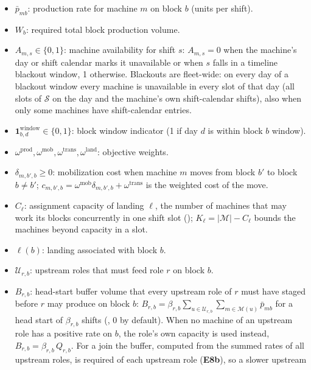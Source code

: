 \begin{itemize}
\tightlist
\item
  \(\bar{p}_{mb}\): production rate for machine \(m\) on block \(b\)
  (units per shift).
\item
  \(W_b\): required total block production volume.
\item
  \(A_{m,s} \in \{0,1\}\): machine availability for shift \(s\):
  \(A_{m,s}=0\) when the machine's day or shift calendar marks it
  unavailable or when \(s\) falls in a timeline blackout window, 1
  otherwise. Blackouts are fleet-wide: on every day of a blackout window
  every machine is unavailable in every slot of that day (all slots of
  \(\mathcal{S}\) on the day and the machine's own shift-calendar
  shifts), also when only some machines have shift-calendar entries.
\item
  \(\mathbf{1}^{\text{window}}_{b,d} \in \{0,1\}\): block window
  indicator (1 if day \(d\) is within block \(b\) window).
\item
  \(\omega^{\text{prod}},\omega^{\text{mob}},\omega^{\text{trans}},\omega^{\text{land}}\):
  objective weights.
\item
  \(\delta_{m,b',b} \ge 0\): mobilization cost when machine \(m\) moves
  from block \(b'\) to block \(b \ne b'\);
  \(c_{m,b',b} = \omega^{\text{mob}}\delta_{m,b',b} + \omega^{\text{trans}}\)
  is the weighted cost of the move.
\item
  \(C_{\ell}\): assignment capacity of landing \(\ell\), the number of
  machines that may work its blocks concurrently in one shift slot
  ();
  \(K_{\ell} = |\mathcal{M}| - C_{\ell}\) bounds the machines beyond
  capacity in a slot.
\item
  \(\ell(b)\): landing associated with block \(b\).
\item
  \(\mathcal{U}_{r,b}\): upstream roles that must feed role \(r\) on
  block \(b\).
\item
  \(B_{r,b}\): head-start buffer volume that every upstream role of
  \(r\) must have staged before \(r\) may produce on block \(b\):
  \(B_{r,b}=\beta_{r,b}\sum_{u\in\mathcal{U}_{r,b}}\sum_{m\in\mathcal{M}(u)}\bar{p}_{mb}\)
  for a head start of \(\beta_{r,b}\) shifts
  (, 0 by default). When no machine of
  an upstream role has a positive rate on \(b\), the role's own capacity
  is used instead, \(B_{r,b}=\beta_{r,b}\,Q_{r,b}\). For a join the
  buffer, computed from the summed rates of all upstream roles, is
  required of each upstream role (\textbf{E8b}), so a slower upstream

\end{itemize}
